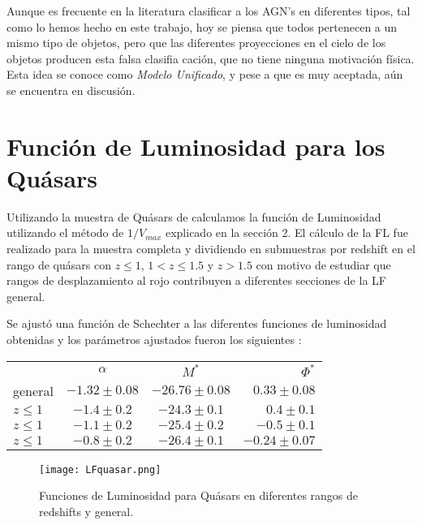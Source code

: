 \documentclass[a4paper,10pt]{article}
\begin{document}
Aunque es frecuente en la literatura clasificar a los AGN's en diferentes tipos, tal como lo hemos hecho en este trabajo, hoy se piensa que todos pertenecen a un mismo tipo de objetos, pero que las diferentes proyecciones en el cielo de los objetos producen esta falsa clasifia
caci\'on, que no tiene ninguna motivaci\'on f\'isica. 
Esta idea se conoce como \textit{Modelo Unificado}, y pese a que es muy aceptada, a\'un se encuentra en discusi\'on. 
    
\section{Funci\'on de Luminosidad para los Qu\'asars}
Utilizando la muestra de Qu\'asars de \citep{Zandivarez2009} calculamos la funci\'on de Luminosidad utilizando el m\'etodo de $1/V_{max}$ explicado en la secci\'on 2. El c\'alculo de la FL fue realizado para la muestra completa y dividiendo en submuestras por redshift en el rango de qu\'asars con $z\leq1$, $1<z\leq1.5$ y $z>1.5$   con motivo de estudiar que rangos de desplazamiento al rojo contribuyen a diferentes secciones de la LF general. 

Se ajust\'o una funci\'on de Schechter a las diferentes funciones de luminosidad obtenidas y los par\'ametros ajustados fueron los siguientes : 

\begin{tabular}{| l | c | c | r | }
 \hline			
    & $\alpha$ & $M^{\ast}$ & $\Phi^{\ast}$ \\
   general & $-1.32\pm0.08$ & $-26.76\pm0.08$ & $0.33\pm0.08$\\
   $z\leq1 $& $-1.4\pm0.2$ &$ -24.3\pm0.1$ & $0.4\pm0.1$ \\
 $z\leq1$ &$ -1.1\pm0.2 $& $-25.4\pm0.2$ & $-0.5\pm0.1$\\
 $ z\leq1$ & $-0.8\pm0.2$ & $-26.4\pm0.1$ & $-0.24\pm0.07$\\
   \hline  
 \end{tabular}

\begin{figure}[h]
 \centering
 \texttt{[image: LFquasar.png]}
 \caption{Funciones de Luminosidad para Qu\'asars en diferentes rangos de redshifts y general.}
 \label{fig:2}
\end{figure}
 
\end{document}
